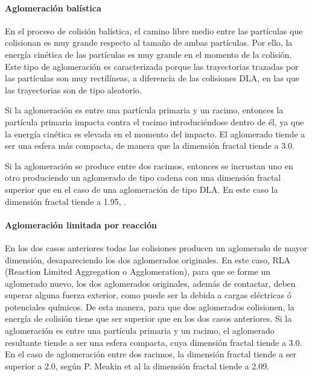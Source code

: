 \paragraph{Aglomeración balística} \label{paragrah:Aglomeracionbalistica}

\par En el proceso de colisión balística, el camino libre medio entre las partículas que colisionan es muy grande respecto al tamaño de ambas partículas. Por ello, la energía cinética de las partículas es muy grande en el momento de la colisión. Este tipo de aglomeración es caracterizada porque las trayectorias trazadas por las partículas son muy rectilíneas, a diferencia de las colisiones DLA, en las que las trayectorias son de tipo aleatorio.

\par Si la aglomeración es entre una partícula primaria y un racimo, entonces la partícula primaria impacta contra el racimo introduciéndose dentro de él, ya que la energía cinética es elevada en el momento del impacto. El aglomerado tiende a ser una esfera más compacta, de manera que la dimensión fractal tiende a 3.0. 

\par Si la aglomeración se produce entre dos racimos, entonces se incrustan uno en otro produciendo un aglomerado de tipo cadena con una dimensión fractal superior que en el caso de una aglomeración de tipo DLA. En este caso la dimensión fractal tiende a 1.95, \cite{megaridisetal:1990}.

\paragraph{Aglomeración limitada por reacción} \label{paragrah:AglomeracionlimitadaporReaccion}

\par En los dos casos anteriores todas las colisiones producen un aglomerado de mayor dimensión, desapareciendo los dos aglomerados originales. En este caso, RLA (Reaction Limited Aggregation o Agglomeration), para que se forme un aglomerado nuevo, los dos aglomerados originales, además de contactar, deben superar alguna fuerza exterior, como puede ser la debida a cargas eléctricas ó potenciales químicos. De esta manera, para que dos aglomerados colisionen, la energía de colisión tiene que ser superior que en los dos casos anteriores. Si la aglomeración es entre una partícula primaria y un racimo, el aglomerado resultante tiende a ser una esfera compacta, cuya dimensión fractal tiende a 3.0. En el caso de aglomeración entre dos racimos, la dimensión fractal tiende a ser superior a 2.0, según P. Meakin et al \cite{meakinetal:1989} la dimensión fractal tiende a 2.09.

